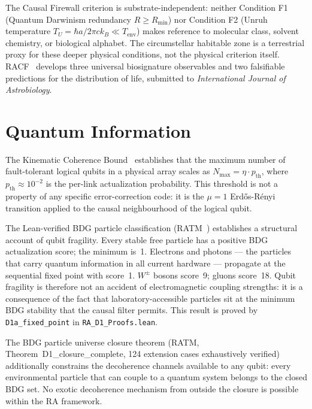 \documentclass[11pt,a4paper]{article}
\begin{document}
The Causal Firewall criterion is substrate-independent: neither Condition
F1 (Quantum Darwinism redundancy $R \geq R_{\min}$) nor Condition F2
(Unruh temperature $T_U = \hbar a/2\pi c k_B \ll T_{\mathrm{env}}$) makes
reference to molecular class, solvent chemistry, or biological alphabet.
The circumstellar habitable zone is a terrestrial proxy for these deeper
physical conditions, not the physical criterion itself.
RACF~\citep{Sandeman2026RACF} develops three universal biosignature
observables and two falsifiable predictions for the distribution of life,
submitted to \emph{International Journal of Astrobiology}.
\n%
\section{Quantum Information}
\label{sec:QI}

The Kinematic Coherence Bound~\citep{Sandeman2026RAQI} establishes
that the maximum number of fault-tolerant logical qubits in a physical
array scales as $N_{\max} = \eta \cdot p_{\mathrm{th}}$, where
$p_{\mathrm{th}} \approx 10^{-2}$ is the per-link actualization
probability. This threshold is not a property of any specific
error-correction code: it is the $\mu = 1$ Erd\H{o}s-R\'{e}nyi
transition applied to the causal neighbourhood of the logical qubit.

The Lean-verified BDG particle classification (RATM~\citep{Sandeman2026RATM})
establishes a structural account of qubit fragility. Every stable free
particle has a positive BDG actualization score; the minimum is~1.
Electrons and photons --- the particles that carry quantum information
in all current hardware --- propagate at the sequential fixed point
with score~1. $W^\pm$ bosons score~9; gluons score~18. Qubit fragility
is therefore not an accident of electromagnetic coupling strengths: it
is a consequence of the fact that laboratory-accessible particles sit at
the minimum BDG stability that the causal filter permits. This result is
proved by \texttt{D1a\_fixed\_point} in \texttt{RA\_D1\_Proofs.lean}.

The BDG particle universe closure theorem (RATM, Theorem~D1\_closure\_complete,
124 extension cases exhaustively verified) additionally constrains the
decoherence channels available to any qubit: every environmental particle
that can couple to a quantum system belongs to the closed BDG set.
No exotic decoherence mechanism from outside the closure is possible
within the RA framework.
\end{document}
